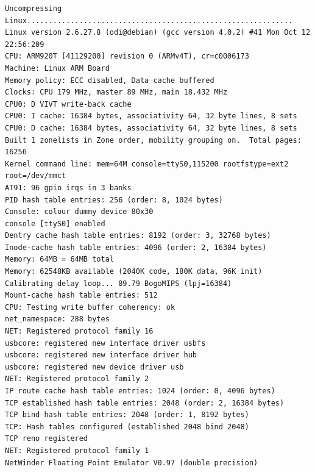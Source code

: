 \documentclass[a4paper,12pt]{book}
\begin{document}
\begin{lstlisting}[basicstyle={\footnotesize\ttfamily}]
Uncompressing Linux.............................................................
Linux version 2.6.27.8 (odi@debian) (gcc version 4.0.2) #41 Mon Oct 12 22:56:209
CPU: ARM920T [41129200] revision 0 (ARMv4T), cr=c0006173                        
Machine: Linux ARM Board                                                        
Memory policy: ECC disabled, Data cache buffered                                
Clocks: CPU 179 MHz, master 89 MHz, main 18.432 MHz                             
CPU0: D VIVT write-back cache                                                   
CPU0: I cache: 16384 bytes, associativity 64, 32 byte lines, 8 sets             
CPU0: D cache: 16384 bytes, associativity 64, 32 byte lines, 8 sets             
Built 1 zonelists in Zone order, mobility grouping on.  Total pages: 16256      
Kernel command line: mem=64M console=ttyS0,115200 rootfstype=ext2 root=/dev/mmct
AT91: 96 gpio irqs in 3 banks                                                   
PID hash table entries: 256 (order: 8, 1024 bytes)                              
Console: colour dummy device 80x30                                              
console [ttyS0] enabled                                                         
Dentry cache hash table entries: 8192 (order: 3, 32768 bytes)                   
Inode-cache hash table entries: 4096 (order: 2, 16384 bytes)                    
Memory: 64MB = 64MB total                                                       
Memory: 62548KB available (2040K code, 180K data, 96K init)                     
Calibrating delay loop... 89.79 BogoMIPS (lpj=16384)                             
Mount-cache hash table entries: 512                                             
CPU: Testing write buffer coherency: ok                                         
net_namespace: 288 bytes                                                        
NET: Registered protocol family 16                                              
usbcore: registered new interface driver usbfs                                  
usbcore: registered new interface driver hub                                    
usbcore: registered new device driver usb                                       
NET: Registered protocol family 2                                               
IP route cache hash table entries: 1024 (order: 0, 4096 bytes)
TCP established hash table entries: 2048 (order: 2, 16384 bytes)
TCP bind hash table entries: 2048 (order: 1, 8192 bytes)
TCP: Hash tables configured (established 2048 bind 2048)
TCP reno registered
NET: Registered protocol family 1
NetWinder Floating Point Emulator V0.97 (double precision)

\end{lstlisting}
\end{document}
